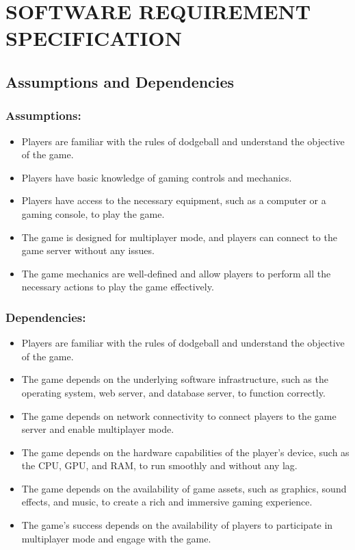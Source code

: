 \documentclass[12pt]{report}
\begin{document}
\centering
\section{SOFTWARE REQUIREMENT SPECIFICATION}
\raggedright
\subsection{Assumptions and Dependencies}

\justifying
\setlength{\parindent}{4em}
\setlength{\parskip}{0.5em}
\renewcommand{\baselinestretch}{1.5}

\normalsize
\hspace{1.7cm}\subsubsection{Assumptions:}
\begin{itemize}\item Players are familiar with the rules of dodgeball and understand the objective of the game.
\item Players have basic knowledge of gaming controls and mechanics.
\item Players have access to the necessary equipment, such as a computer or a gaming console, to play the game.
\item The game is designed for multiplayer mode, and players can connect to the game server without any issues.
\item The game mechanics are well-defined and allow players to perform all the necessary actions to play the game effectively.
\end{itemize}

\hspace{1.7cm}\subsubsection{Dependencies:}
\begin{itemize}\item Players are familiar with the rules of dodgeball and understand the objective of the game.
\item The game depends on the underlying software infrastructure, such as the operating system, web server, and database server, to function correctly.
\item The game depends on network connectivity to connect players to the game server and enable multiplayer mode.
\item The game depends on the hardware capabilities of the player's device, such as the CPU, GPU, and RAM, to run smoothly and without any lag.
\item The game depends on the availability of game assets, such as graphics, sound effects, and music, to create a rich and immersive gaming experience.
\item The game's success depends on the availability of players to participate in multiplayer mode and engage with the game.
\end{itemize}
\end{document}
